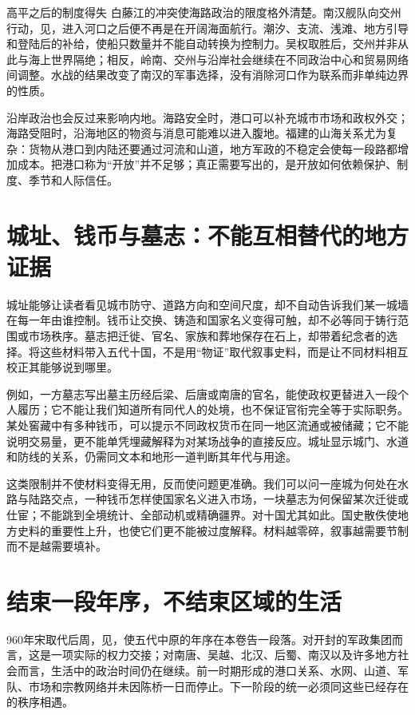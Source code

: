 \begin{causalchain}{高平之后的制度得失}
白藤江的冲突使海路政治的限度格外清楚。南汉舰队向交州行动，见，进入河口之后便不再是在开阔海面航行。潮汐、支流、浅滩、地方引导和登陆后的补给，使船只数量并不能自动转换为控制力。吴权取胜后，交州并非从此与海上世界隔绝；相反，岭南、交州与沿岸社会继续在不同政治中心和贸易网络间调整。水战的结果改变了南汉的军事选择，没有消除河口作为联系而非单纯边界的性质。

沿岸政治也会反过来影响内地。海路安全时，港口可以补充城市市场和政权外交；海路受阻时，沿海地区的物资与消息可能难以进入腹地。福建的山海关系尤为复杂：货物从港口到内陆还要通过河流和山道，地方军政的不稳定会使每一段路都增加成本。把港口称为“开放”并不足够；真正需要写出的，是开放如何依赖保护、制度、季节和人际信任。

\section{城址、钱币与墓志：不能互相替代的地方证据}

城址能够让读者看见城市防守、道路方向和空间尺度，却不自动告诉我们某一城墙在每一年由谁控制。钱币让交换、铸造和国家名义变得可触，却不必等同于铸行范围或市场秩序。墓志把迁徙、官名、家族和葬地保存在石上，却带着纪念者的选择。将这些材料带入五代十国，不是用“物证”取代叙事史料，而是让不同材料相互校正其能够说到哪里。

例如，一方墓志写出墓主历经后梁、后唐或南唐的官名，能使政权更替进入一段个人履历；它不能让我们知道所有同代人的处境，也不保证官衔完全等于实际职务。某处窖藏中有多种钱币，可以提示不同政权货币在同一地区流通或被储藏；它不能说明交易量，更不能单凭埋藏解释为对某场战争的直接反应。城址显示城门、水道和防线的关系，仍需同文本和地形一道判断其年代与用途。

这类限制并不使材料变得无用，反而使问题更准确。我们可以问一座城为何处在水路与陆路交点，一种钱币怎样使国家名义进入市场，一块墓志为何保留某次迁徙或仕宦；不能跳到全境统计、全部动机或精确疆界。对十国尤其如此。国史散佚使地方史料的重要性上升，也使它们更不能被过度解释。材料越零碎，叙事越需要节制而不是越需要填补。

\section{结束一段年序，不结束区域的生活}

960年宋取代后周，见，使五代中原的年序在本卷告一段落。对开封的军政集团而言，这是一项实际的权力交接；对南唐、吴越、北汉、后蜀、南汉以及许多地方社会而言，生活中的政治时间仍在继续。前一时期形成的港口关系、水网、山道、军队、市场和宗教网络并未因陈桥一日而停止。下一阶段的统一必须同这些已经存在的秩序相遇。


\end{causalchain}
